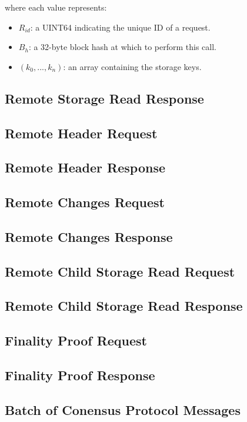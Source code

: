 \documentclass{book}
\begin{document}
where each value represents:

\begin{itemize}
    \item $R_{id}$: a UINT64 indicating the unique ID of a request.
    \item $B_h$: a 32-byte block hash at which to perform this call.
    \item $(k_0, ..., k_n)$: an array containing the storage keys.
\end{itemize}

\subsection{Remote Storage Read Response}

\subsection{Remote Header Request}

\subsection{Remote Header Response}

\subsection{Remote Changes Request}

\subsection{Remote Changes Response}

\subsection{Remote Child Storage Read Request}

\subsection{Remote Child Storage Read Response}

\subsection{Finality Proof Request}

\subsection{Finality Proof Response}

\subsection{Batch of Conensus Protocol Messages}
\end{document}
